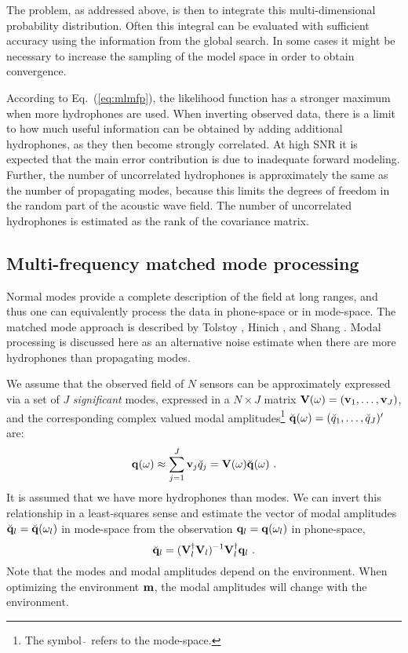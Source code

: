 \documentclass{saclantc}
\newcommand{\modespace}[1]{\breve{{#1}}}
\begin{document}
The problem, as addressed above, is then to integrate this 
multi-dimensional probability distribution.  Often this integral can be
evaluated with sufficient accuracy using the information from the
global search. In some cases it might be necessary to increase the
sampling of the model space in order to obtain convergence.

According to Eq.~(\ref{eq:mlmfp}), the likelihood function has a
stronger maximum when more hydrophones are used.  When inverting observed data,
there is a limit to how much useful information can be obtained by
adding additional hydrophones, 
as they  then become strongly correlated.  At high SNR 
it is expected that
the main error contribution is due to inadequate forward modeling. 
Further, the number of uncorrelated hydrophones is approximately the same
as the number of propagating modes, because this limits the degrees of
freedom in the random part of the acoustic wave field.
The number of  uncorrelated hydrophones is estimated as the rank of the
covariance matrix.

\subsection{Multi-frequency matched mode processing}
\label{se:mmp}

Normal modes provide a complete description of the field at long
ranges, and thus one can equivalently process the data in 
phone-space or in mode-space.
The matched mode approach is described by  Tolstoy
\cite{tolstoy}, Hinich \cite{hinich:asa79}, and
Shang \cite{shang:asa85}.
Modal processing is discussed here as an alternative noise 
estimate when there are more hydrophones than propagating modes.

We assume that the observed field of $N$ sensors can be approximately expressed via 
a set of $J$ {\it significant\/} modes, expressed in a 
$N\times J$ matrix ${\bf V}(\omega)=({\bf v}_1,\ldots,{\bf v}_J)$, 
and the corresponding complex valued modal 
amplitudes\footnote{ The symbol $\modespace{~}$ refers to the mode-space.} 
$\modespace{\bf q}(\omega)=(\modespace{q}_1,\ldots,\modespace{q}_J)'$ are:
\begin{equation}
  {\bf q}(\omega) \approx 
  \sum\limits^J_{j=1}{\bf v}_j \modespace{q}_j =
  {\bf V}(\omega) \modespace{\bf q}(\omega)~.
  \label{eq:modes}
\end{equation}
It is assumed that we have more hydrophones than modes.
We can invert this relationship in a least-squares sense and estimate
the vector of modal amplitudes 
$\modespace{\bf q}_l=\modespace{\bf q}(\omega_l)$ in mode-space from the 
observation ${\bf q}_l={\bf q}(\omega_l)$ in phone-space,
\begin{equation}
   \modespace{{\bf q}}_l = 
   ({\bf V}^{\dagger}_l{\bf V}_l)^{-1}{\bf V}^{\dagger}_l
        {\bf q}_l~.
\end{equation}
Note that the modes and modal amplitudes depend on the
environment. When optimizing the environment ${\bf m} $, the modal
amplitudes will change with the environment.
\end{document}
